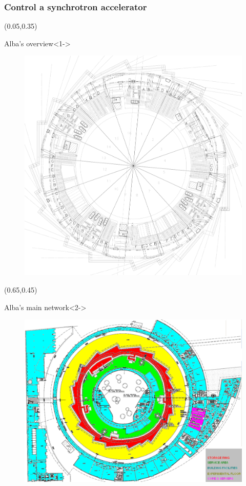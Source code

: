\documentclass{beamer}
\begin{document}
\begin{frame}
\frametitle{Control a synchrotron accelerator}
    \begin{textblock*}{50mm}(0.05\textwidth,0.35\textheight)
        \begin{block}{Alba's overview}<1->
            \begin{figure}
                \includegraphics[width=\textwidth]{imgs/alba/Alba_overview.png}
            \end{figure}
        \end{block}
    \end{textblock*}
    \begin{textblock*}{50mm}(0.65\textwidth,0.45\textheight)
        \begin{block}{Alba's main network}<2->
            \begin{figure}
                \includegraphics[width=\textwidth]{imgs/alba/Alba_MainNetwork.png}

\end{figure}
\end{block}
\end{textblock*}
\end{frame}
\end{document}
